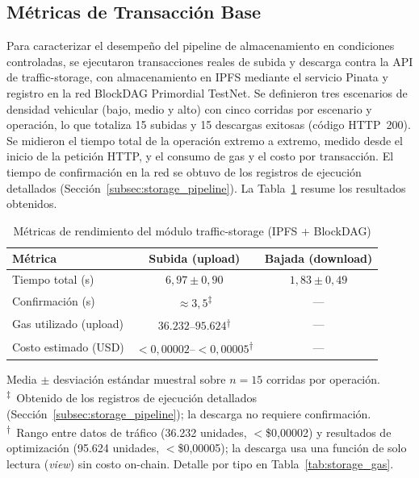 \subsection{Métricas de Transacción Base}
\label{subsec:storage_base}

Para caracterizar el desempeño del pipeline de almacenamiento en condiciones controladas, se
ejecutaron transacciones reales de subida y descarga contra la API de traffic-storage,
con almacenamiento en IPFS mediante el servicio Pinata y registro en la red BlockDAG
Primordial TestNet. Se definieron tres escenarios de densidad vehicular (bajo, medio y
alto) con cinco corridas por escenario y operación, lo que totaliza 15 subidas y 15
descargas exitosas (código HTTP~200). Se midieron el tiempo total de la operación extremo a
extremo, medido desde el inicio de la petición HTTP, y el consumo de gas y el costo por
transacción. El tiempo de confirmación en la red se obtuvo de los registros de ejecución
detallados (Sección~\ref{subsec:storage_pipeline}). La
Tabla~\ref{tab:storage_metricas_base} resume los resultados obtenidos.

\begin{table}[htbp]
\renewcommand{\arraystretch}{1.3}
\caption{Métricas de rendimiento del módulo traffic-storage (IPFS + BlockDAG)}
\label{tab:storage_metricas_base}
\centering
\footnotesize
\begin{tabular}{lcc}
\hline
\textbf{Métrica} & \textbf{Subida (upload)} & \textbf{Bajada (download)} \\
\hline
Tiempo total (s)       & $6{,}97 \pm 0{,}90$ & $1{,}83 \pm 0{,}49$ \\
Confirmación (s)       & $\approx 3{,}5$\textsuperscript{‡} & --- \\
Gas utilizado (upload) & $36.232$--$95.624$\textsuperscript{†}  & ---                 \\
Costo estimado (USD)   & $<0{,}00002$--$<0{,}00005$\textsuperscript{†} & ---       \\
\hline
\end{tabular}
\smallskip

\noindent Media $\pm$ desviación estándar muestral sobre $n=15$ corridas por operación.
\textsuperscript{‡}~Obtenido de los registros de ejecución detallados
(Sección~\ref{subsec:storage_pipeline}); la descarga no requiere confirmación.\\
\textsuperscript{†}~Rango entre datos de tráfico (36.232 unidades,
$<$\$0{,}00002) y resultados de optimización (95.624 unidades, $<$\$0{,}00005);
la descarga usa una función de solo lectura (\textit{view}) sin costo on-chain.
Detalle por tipo en Tabla~\ref{tab:storage_gas}.
\end{table}

